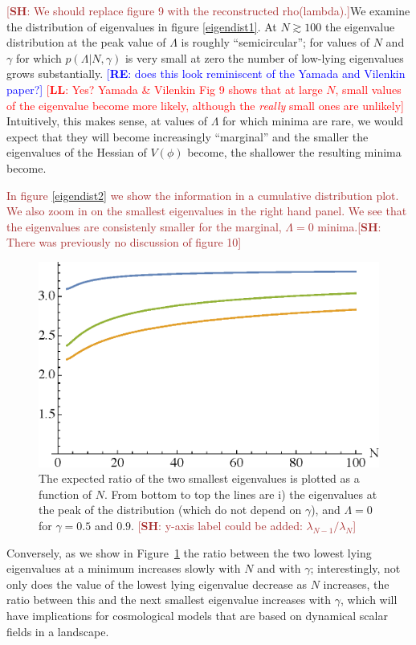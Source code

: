 \documentclass[12pt]{article}
\newcommand{\re}[1]{\textcolor{blue}{[{\bf RE}: #1]}}
\newcommand{\lfl}[1]{\textcolor{red}{[{\bf LL}: #1]}}
\newcommand{\SH}[1]{\textcolor{brown}{[{\bf SH}: #1]}}
\newcommand{\sh}[1]{\textcolor{brown}{#1}}
\begin{document}
\SH{We should replace figure 9 with the reconstructed rho(lambda).}We examine the distribution of eigenvalues in figure \ref{eigendist1}. At  $N\gtrsim 100$ the eigenvalue distribution at the peak value of $\Lambda$ is roughly ``semicircular''; for values of $N$ and $\gamma$ for which $p(\Lambda|N,\gamma)$ is very small at zero the number of low-lying eigenvalues grows substantially. \re{does this look reminiscent of the Yamada and Vilenkin paper?} \lfl{Yes? Yamada \& Vilenkin Fig 9 shows that at large $N$, small values of the eigenvalue become more likely, although the \emph{really} small ones are unlikely} Intuitively, this makes sense, at values of $\Lambda$ for which minima are rare, we would expect that they will become increasingly ``marginal'' and the smaller the eigenvalues of the Hessian of $V(\phi)$ become, the shallower the resulting minima become.

\sh{In figure \ref{eigendist2} we show the information in a cumulative distribution plot. We also zoom in on the smallest eigenvalues in the right hand panel. We see that the eigenvalues are consistenly smaller for the marginal, $\Lambda=0$ minima.}\SH{There was previously no discussion of figure 10}

\begin{figure} 
  \centering
  \includegraphics[width=.6\linewidth]{ratio.eps}  
  \caption{The expected ratio of the two smallest eigenvalues is plotted as a function of $N$.   From bottom to top the lines are i) the eigenvalues at the peak  of the distribution (which do not depend on $\gamma$), and $\Lambda=0$ for $\gamma =0.5$ and $0.9$. \SH{y-axis label could be added: $\lambda_{N-1}/\lambda_N$}}
  \label{ratio}
\end{figure}

Conversely, as we show in Figure~\ref{ratio} the ratio between the two lowest lying eigenvalues at a minimum increases slowly with $N$ and with $\gamma$; interestingly, not only does the value of the lowest lying eigenvalue decrease as  $N$ increases, the ratio between this and the next smallest eigenvalue increases with $\gamma$, which will have implications for cosmological models that are based on dynamical scalar fields in a landscape. 
\end{document}
